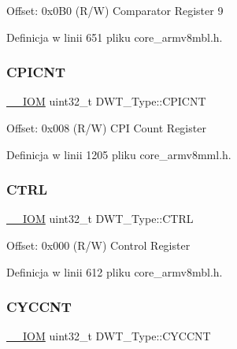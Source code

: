 Offset\+: 0x0\+B0 (R/W) Comparator Register 9 

Definicja w linii 651 pliku core\+\_\+armv8mbl.\+h.

\mbox{\label{struct_d_w_t___type_a2c08096c82abe245c0fa97badc458154}} 
\subsubsection{\texorpdfstring{C\+P\+I\+C\+NT}{CPICNT}}
{\footnotesize\ttfamily \hyperlink{core__sc300_8h_ab6caba5853a60a17e8e04499b52bf691}{\+\_\+\+\_\+\+I\+OM} uint32\+\_\+t D\+W\+T\+\_\+\+Type\+::\+C\+P\+I\+C\+NT}

Offset\+: 0x008 (R/W) C\+PI Count Register 

Definicja w linii 1205 pliku core\+\_\+armv8mml.\+h.

\mbox{\label{struct_d_w_t___type_add790c53410023b3b581919bb681fe2a}} 
\subsubsection{\texorpdfstring{C\+T\+RL}{CTRL}}
{\footnotesize\ttfamily \hyperlink{core__sc300_8h_ab6caba5853a60a17e8e04499b52bf691}{\+\_\+\+\_\+\+I\+OM} uint32\+\_\+t D\+W\+T\+\_\+\+Type\+::\+C\+T\+RL}

Offset\+: 0x000 (R/W) Control Register 

Definicja w linii 612 pliku core\+\_\+armv8mbl.\+h.

\mbox{\label{struct_d_w_t___type_a102eaa529d9098242851cb57c52b42d9}} 
\subsubsection{\texorpdfstring{C\+Y\+C\+C\+NT}{CYCCNT}}
{\footnotesize\ttfamily \hyperlink{core__sc300_8h_ab6caba5853a60a17e8e04499b52bf691}{\+\_\+\+\_\+\+I\+OM} uint32\+\_\+t D\+W\+T\+\_\+\+Type\+::\+C\+Y\+C\+C\+NT}

